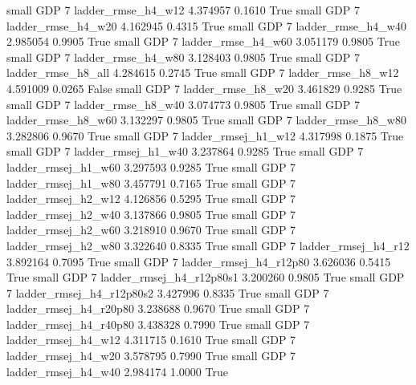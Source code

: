      small      GDP                 7       ladder_rmse_h4_w12   4.374957      0.1610    True
     small      GDP                 7       ladder_rmse_h4_w20   4.162945      0.4315    True
     small      GDP                 7       ladder_rmse_h4_w40   2.985054      0.9905    True
     small      GDP                 7       ladder_rmse_h4_w60   3.051179      0.9805    True
     small      GDP                 7       ladder_rmse_h4_w80   3.128403      0.9805    True
     small      GDP                 7       ladder_rmse_h8_all   4.284615      0.2745    True
     small      GDP                 7       ladder_rmse_h8_w12   4.591009      0.0265   False
     small      GDP                 7       ladder_rmse_h8_w20   3.461829      0.9285    True
     small      GDP                 7       ladder_rmse_h8_w40   3.074773      0.9805    True
     small      GDP                 7       ladder_rmse_h8_w60   3.132297      0.9805    True
     small      GDP                 7       ladder_rmse_h8_w80   3.282806      0.9670    True
     small      GDP                 7      ladder_rmsej_h1_w12   4.317998      0.1875    True
     small      GDP                 7      ladder_rmsej_h1_w40   3.237864      0.9285    True
     small      GDP                 7      ladder_rmsej_h1_w60   3.297593      0.9285    True
     small      GDP                 7      ladder_rmsej_h1_w80   3.457791      0.7165    True
     small      GDP                 7      ladder_rmsej_h2_w12   4.126856      0.5295    True
     small      GDP                 7      ladder_rmsej_h2_w40   3.137866      0.9805    True
     small      GDP                 7      ladder_rmsej_h2_w60   3.218910      0.9670    True
     small      GDP                 7      ladder_rmsej_h2_w80   3.322640      0.8335    True
     small      GDP                 7      ladder_rmsej_h4_r12   3.892164      0.7095    True
     small      GDP                 7   ladder_rmsej_h4_r12p80   3.626036      0.5415    True
     small      GDP                 7 ladder_rmsej_h4_r12p80s1   3.200260      0.9805    True
     small      GDP                 7 ladder_rmsej_h4_r12p80s2   3.427996      0.8335    True
     small      GDP                 7   ladder_rmsej_h4_r20p80   3.238688      0.9670    True
     small      GDP                 7   ladder_rmsej_h4_r40p80   3.438328      0.7990    True
     small      GDP                 7      ladder_rmsej_h4_w12   4.311715      0.1610    True
     small      GDP                 7      ladder_rmsej_h4_w20   3.578795      0.7990    True
     small      GDP                 7      ladder_rmsej_h4_w40   2.984174      1.0000    True
